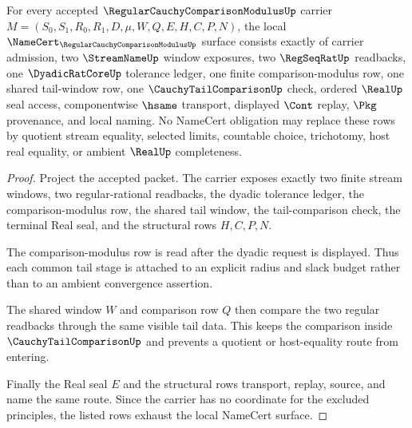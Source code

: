 \begin{theorem}
\label{thm:regular-cauchy-comparison-modulus-namecert-obligations}
For every accepted $\RegularCauchyComparisonModulusUp$ carrier $M=(S_0,S_1,R_0,R_1,D,\mu,W,Q,E,H,C,P,N)$, the local $\NameCert_{\RegularCauchyComparisonModulusUp}$ surface consists exactly of carrier admission, two $\StreamNameUp$ window exposures, two $\RegSeqRatUp$ readbacks, one $\DyadicRatCoreUp$ tolerance ledger, one finite comparison-modulus row, one shared tail-window row, one $\CauchyTailComparisonUp$ check, ordered $\RealUp$ seal access, componentwise $\hsame$ transport, displayed $\Cont$ replay, $\Pkg$ provenance, and local naming. No NameCert obligation may replace these rows by quotient stream equality, selected limits, countable choice, trichotomy, host real equality, or ambient $\RealUp$ completeness.
\end{theorem}
\begin{proof}
Project the accepted packet. The carrier exposes exactly two finite stream windows, two regular-rational readbacks, the dyadic tolerance ledger, the comparison-modulus row, the shared tail window, the tail-comparison check, the terminal Real seal, and the structural rows $H,C,P,N$.

The comparison-modulus row is read after the dyadic request is displayed. Thus each common tail stage is attached to an explicit radius and slack budget rather than to an ambient convergence assertion.

The shared window $W$ and comparison row $Q$ then compare the two regular readbacks through the same visible tail data. This keeps the comparison inside $\CauchyTailComparisonUp$ and prevents a quotient or host-equality route from entering.

Finally the Real seal $E$ and the structural rows transport, replay, source, and name the same route. Since the carrier has no coordinate for the excluded principles, the listed rows exhaust the local NameCert surface.
\end{proof}

